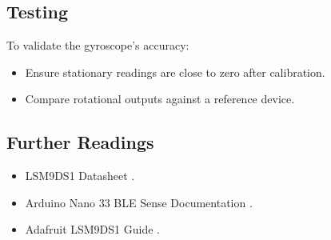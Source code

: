 \subsection{Testing}
To validate the gyroscope's accuracy:
\begin{itemize}
    \item Ensure stationary readings are close to zero after calibration.
    \item Compare rotational outputs against a reference device.
\end{itemize}

\subsection{Further Readings}
\begin{itemize}
    \item LSM9DS1 Datasheet \cite{STM:2015}.
    \item Arduino Nano 33 BLE Sense Documentation \cite{ArduinoNano33Sense2025}.
    \item Adafruit LSM9DS1 Guide \cite{AdafruitLSM9DS1}.
\end{itemize}